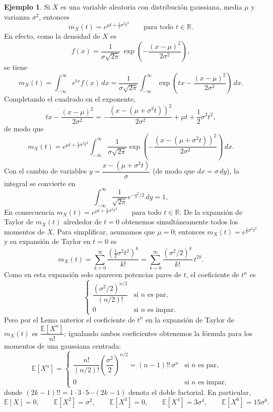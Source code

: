 \documentclass[12pt]{amsart}
\theoremstyle{definition}
\newtheorem{examplex}[lemma]{Ejemplo}
\newcommand{\RR}{\ensuremath{\mathbb{R}}}
\newcommand{\EE}{\ensuremath{\mathbb{E}}}
\begin{document}
\begin{examplex} \label{ex: Gauss} Si $X$ es una variable aleatoria con distribución gaussiana, media $\mu$ y varianza $\sigma^2$, entonces
\[
m_X(t)=e^{\mu t+\frac{1}{2}\sigma^2 t^2}\qquad\text{para todo }t\in\RR.
\]
En efecto, como la densidad de $X$ es
\[
f(x)=\frac{1}{\sigma\sqrt{2\pi}}\,\exp\!\left(-\frac{(x-\mu)^2}{2\sigma^2}\right),
\]
se tiene
\[
m_X(t)=\int_{-\infty}^{\infty}e^{tx}f(x)\,dx
   =\frac{1}{\sigma\sqrt{2\pi}}\int_{-\infty}^{\infty}\exp\!\left(tx-\frac{(x-\mu)^2}{2\sigma^2}\right)\,dx.
\]
Completando el cuadrado en el exponente,
\[
tx-\frac{(x-\mu)^2}{2\sigma^2}
   =-\frac{\left(x-(\mu+\sigma^2t)\right)^2}{2\sigma^2}+\mu t+\frac{1}{2}\sigma^2t^2,
\]
de modo que
\[
m_X(t)=e^{\mu t+\frac{1}{2}\sigma^2t^2}\int_{-\infty}^{\infty}\frac{1}{\sigma\sqrt{2\pi}}
   \exp\!\left(-\frac{\left(x-(\mu+\sigma^2t)\right)^2}{2\sigma^2}\right)\,dx.
\]
Con el cambio de variables $y=\dfrac{x-(\mu+\sigma^2t)}{\sigma}$ (de modo que $dx=\sigma\,dy$), la integral se convierte en
\[
\int_{-\infty}^{\infty}\frac{1}{\sqrt{2\pi}}e^{-y^2/2}\,dy=1,
\]
En consecuencia $m_X(t)=e^{\mu t+\frac{1}{2}\sigma^2t^2}\qquad\text{para todo }t\in\RR$.
De la expansión de Taylor de $m_X(t)$ alrededor de $t=0$ obtenemos simultáneamente todos los momentos de $X$. Para simplificar, asumamos que $\mu=0$; entonces $m_X(t)=e^{\frac{1}{2}\sigma^2 t^2}$ y su expansión de Taylor en $t=0$ es
\[
m_X(t)=\sum_{k=0}^{\infty}\frac{\left(\frac{1}{2}\sigma^2 t^2\right)^k}{k!}
   =\sum_{k=0}^{\infty}\frac{(\sigma^2/2)^k}{k!}\,t^{2k}.
\]
Como en esta expansión solo aparecen potencias pares de $t$, el coeficiente de $t^n$ es
\[
\begin{cases}
\dfrac{(\sigma^2/2)^{n/2}}{(n/2)!} & \text{si }n\text{ es par},\\[6pt]
0 & \text{si }n\text{ es impar}.
\end{cases}
\]
Pero por el Lema anterior el coeficiente de $t^n$ en la expansión de Taylor de $m_X(t)$ es $\dfrac{\EE[X^n]}{n!}$; igualando ambos coeficientes obtenemos la fórmula para los momentos de una gaussiana centrada:
\[
\EE[X^n]=\begin{cases}
\dfrac{n!}{(n/2)!}\left(\dfrac{\sigma^2}{2}\right)^{n/2}=(n-1)!!\,\sigma^n & \text{si }n\text{ es par},\\[8pt]
0 & \text{si }n\text{ es impar},
\end{cases}
\]
donde $(2k-1)!!=1\cdot 3\cdot 5\cdots(2k-1)$ denota el doble factorial. En particular,
\[
\EE[X]=0,\qquad \EE[X^2]=\sigma^2,\qquad \EE[X^3]=0,\qquad \EE[X^4]=3\sigma^4,\qquad \EE[X^6]=15\sigma^6.
\]
\end{examplex}    
\end{document}
